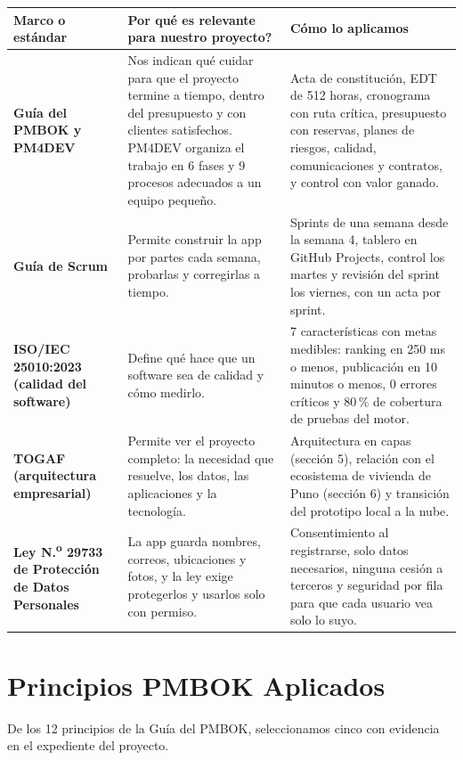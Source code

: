 \documentclass[11pt,a4paper]{article}
\begin{document}
\vspace{0.1cm}
{\small
{}
\noindent\begin{tabularx}{\textwidth}{@{}P{3.0cm} L L@{}}
\toprule
{}
\textbf{Marco o estándar} & \textbf{Por qué es relevante para nuestro proyecto?} & \textbf{Cómo lo aplicamos} \\
\midrule
\textbf{Guía del PMBOK y PM4DEV} & Nos indican qué cuidar para que el proyecto termine a tiempo, dentro del presupuesto y con clientes satisfechos. PM4DEV organiza el trabajo en 6 fases y 9 procesos adecuados a un equipo pequeño. & Acta de constitución, EDT de 512 horas, cronograma con ruta crítica, presupuesto con reservas, planes de riesgos, calidad, comunicaciones y contratos, y control con valor ganado. \\
\textbf{Guía de Scrum} & Permite construir la app por partes cada semana, probarlas y corregirlas a tiempo. & Sprints de una semana desde la semana 4, tablero en GitHub Projects, control los martes y revisión del sprint los viernes, con un acta por sprint. \\
\textbf{ISO/IEC 25010:2023 (calidad del software)} & Define qué hace que un software sea de calidad y cómo medirlo. & 7 características con metas medibles: ranking en 250 ms o menos, publicación en 10 minutos o menos, 0 errores críticos y 80\,\% de cobertura de pruebas del motor. \\
\textbf{TOGAF (arquitectura empresarial)} & Permite ver el proyecto completo: la necesidad que resuelve, los datos, las aplicaciones y la tecnología. & Arquitectura en capas (sección 5), relación con el ecosistema de vivienda de Puno (sección 6) y transición del prototipo local a la nube. \\
\textbf{Ley N.\textsuperscript{o} 29733 de Protección de Datos Personales} & La app guarda nombres, correos, ubicaciones y fotos, y la ley exige protegerlos y usarlos solo con permiso. & Consentimiento al registrarse, solo datos necesarios, ninguna cesión a terceros y seguridad por fila para que cada usuario vea solo lo suyo. \\
\bottomrule
\end{tabularx}
}

\section{Principios PMBOK Aplicados}
De los 12 principios de la Guía del PMBOK, seleccionamos cinco con evidencia en el expediente del proyecto.
\end{document}
